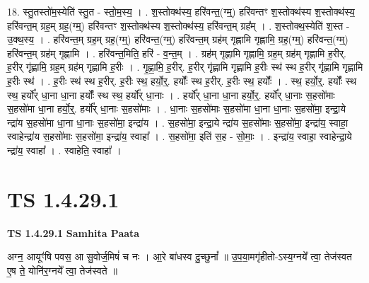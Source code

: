 \documentclass[17pt]{extarticle}
\begin{document}
18. स्तु॒तस्तो॑म॒स्येति॑ स्तु॒त - स्तो॒म॒स्य॒ । . श॒स्तोक्थ॑स्य॒ हरि॑वन्त॒(ग्म्॒) हरि॑वन्तꣳ श॒स्तोक्थ॑स्य श॒स्तोक्थ॑स्य॒ हरि॑वन्त॒म् ग्रह॒म् ग्रह॒(ग्म्॒) हरि॑वन्तꣳ श॒स्तोक्थ॑स्य श॒स्तोक्थ॑स्य॒ हरि॑वन्त॒म् ग्रह᳚म् । . श॒स्तोक्थ॒स्येति॑ श॒स्त - उ॒क्थ॒स्य॒ । . हरि॑वन्त॒म् ग्रह॒म् ग्रह॒(ग्म्॒) हरि॑वन्त॒(ग्म्॒) हरि॑वन्त॒म् ग्रह॑म् गृह्णामि गृह्णामि॒ ग्रह॒(ग्म्॒) हरि॑वन्त॒(ग्म्॒) हरि॑वन्त॒म् ग्रह॑म् गृह्णामि । . हरि॑वन्त॒मिति॒ हरि॑ - व॒न्त॒म् । . ग्रह॑म् गृह्णामि गृह्णामि॒ ग्रह॒म् ग्रह॑म् गृह्णामि ह॒रीर्. ह॒रीर् गृ॑ह्णामि॒ ग्रह॒म् ग्रह॑म् गृह्णामि ह॒रीः । . गृ॒ह्णा॒मि॒ ह॒रीर्. ह॒रीर् गृ॑ह्णामि गृह्णामि ह॒रीः स्थ॑ स्थ ह॒रीर् गृ॑ह्णामि गृह्णामि ह॒रीः स्थ॑ । . ह॒रीः स्थ॑ स्थ ह॒रीर्. ह॒रीः स्थ॒ हर्यो॒र्॒. हर्योः᳚ स्थ ह॒रीर्. ह॒रीः स्थ॒ हर्योः᳚ । . स्थ॒ हर्यो॒र्॒. हर्योः᳚ स्थ स्थ॒ हर्यो᳚र् धा॒ना धा॒ना हर्योः᳚ स्थ स्थ॒ हर्यो᳚र् धा॒नाः । . हर्यो᳚र् धा॒ना धा॒ना हर्यो॒र्॒. हर्यो᳚र् धा॒नाः स॒हसो॑माः स॒हसो॑मा धा॒ना हर्यो॒र्॒. हर्यो᳚र् धा॒नाः स॒हसो॑माः । . धा॒नाः स॒हसो॑माः स॒हसो॑मा धा॒ना धा॒नाः स॒हसो॑मा॒ इन्द्रा॒ये न्द्रा॑य स॒हसो॑मा धा॒ना धा॒नाः स॒हसो॑मा॒ इन्द्रा॑य । . स॒हसो॑मा॒ इन्द्रा॒ये न्द्रा॑य स॒हसो॑माः स॒हसो॑मा॒ इन्द्रा॑य॒ स्वाहा॒ स्वाहेन्द्रा॑य स॒हसो॑माः स॒हसो॑मा॒ इन्द्रा॑य॒ स्वाहा᳚ । . स॒हसो॑मा॒ इति॑ स॒ह - सो॒माः॒ । . इन्द्रा॑य॒ स्वाहा॒ स्वाहेन्द्रा॒ये न्द्रा॑य॒ स्वाहा᳚ । . स्वाहेति॒ स्वाहा᳚ । \newline
\pagebreak
{}

\section{ TS 1.4.29.1 }

\textbf{TS 1.4.29.1 } \newline
\textbf{Samhita Paata} \newline

अग्न॒ आयूꣳ॑षि पवस॒ आ सु॒वोर्ज॒मिषं॑ च नः । आ॒रे बा॑धस्व दु॒च्छुनां᳚ ॥ उ॒प॒या॒मगृ॑हीतो-ऽस्य॒ग्नये᳚ त्वा॒ तेज॑स्वत ए॒ष ते॒ योनि॑र॒ग्नये᳚ त्वा॒ तेज॑स्वते ॥ \newline
\end{document}

